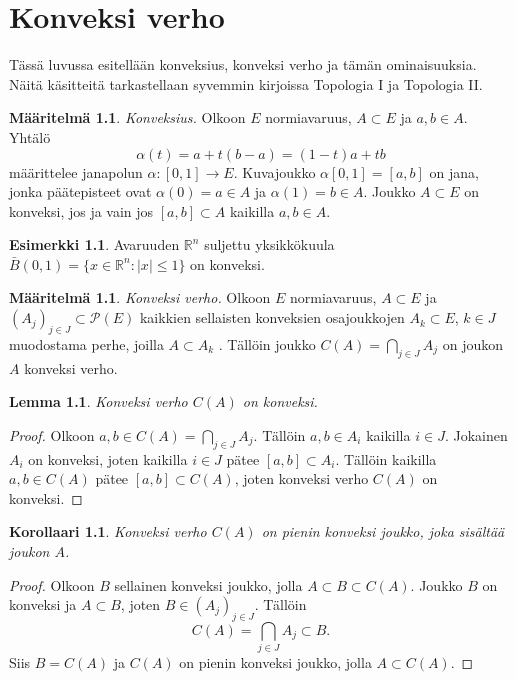 \documentclass[12pt,a4paper,leqno]{report}
\newcommand{\R}{\mathbb{R}}
\theoremstyle{plain}
\newtheorem{lem}[equation]{Lemma}
\newtheorem{kor}[equation]{Korollaari}
\theoremstyle{definition}
\newtheorem{maar}[equation]{Määritelmä}
\newtheorem{esim}[equation]{Esimerkki}
\theoremstyle{remark}
\begin{document}
\chapter{Konveksi verho}\label{konverho}
Tässä luvussa esitellään konveksius, konveksi verho ja tämän ominaisuuksia. Näitä käsitteitä tarkastellaan syvemmin kirjoissa Topologia I ja Topologia II.
\begin{maar}%
\emph{Konveksius.}
 Olkoon $E$ normiavaruus, $A\subset E$ ja $a,b\in A$. Yhtälö 
$$\alpha (t)=a+t(b-a)=(1-t)a+tb$$ 
määrittelee janapolun $\alpha \colon [0,1]\rightarrow E$. Kuvajoukko $\alpha [0,1] = [a,b]$ on jana, jonka päätepisteet ovat $\alpha (0)=a\in A$ ja $\alpha (1)=b\in A$. 
Joukko $A\subset E$ on konveksi, jos ja vain jos $[a,b]\subset A$ kaikilla $a,b\in A$.
\end{maar}
\begin{esim}
Avaruuden $\R ^n$ suljettu yksikkökuula $ \bar B(0,1)= \{x\in \R ^n \colon |x|\leq 1\}$ on konveksi.
\end{esim}
\begin{maar}\emph{Konveksi verho.} Olkoon $E$ normiavaruus, $A\subset E$ ja $(A_j)_{j\in J}\subset \mathcal{P}(E)$ 
kaikkien sellaisten konveksien osajoukkojen $A_k\subset E$, $k\in J$ muodostama perhe, joilla %
$A\subset A_k$%
. Tällöin joukko $C(A)=\bigcap_{j\in J} A_j$ on joukon $A$ konveksi verho. 
\end{maar}
\begin{lem} Konveksi verho $C(A)$ on konveksi.\end{lem} 
\begin{proof} Olkoon $a,b\in C(A)=\bigcap_{j\in J} A_j$. 
Tällöin $a,b\in A_i$ kaikilla $i\in J$. %
Jokainen $A_i$ on konveksi, joten kaikilla $i\in J$ pätee $[a,b]\subset A_i$.
Tällöin kaikilla $a,b\in C(A)$ pätee $[a,b] \subset C(A)$, joten konveksi verho $C(A)$ on konveksi.
\end{proof}
\begin{kor}\label{konv-pienin}Konveksi verho $C(A)$ on pienin konveksi joukko, joka sisältää joukon $A$.
\end{kor}
\begin{proof} Olkoon $B$ sellainen konveksi joukko, jolla $A\subset B\subset C(A)$. 
Joukko $B$ on konveksi ja $A\subset B$, joten $B\in (A_j)_{j\in J}$. 
Tällöin $$C(A)=\bigcap_{j\in J} A_j\subset B.$$
Siis $B= C(A)$ ja $C(A)$ on pienin konveksi joukko, jolla $A\subset C(A)$.
\end{proof}
\end{document}
